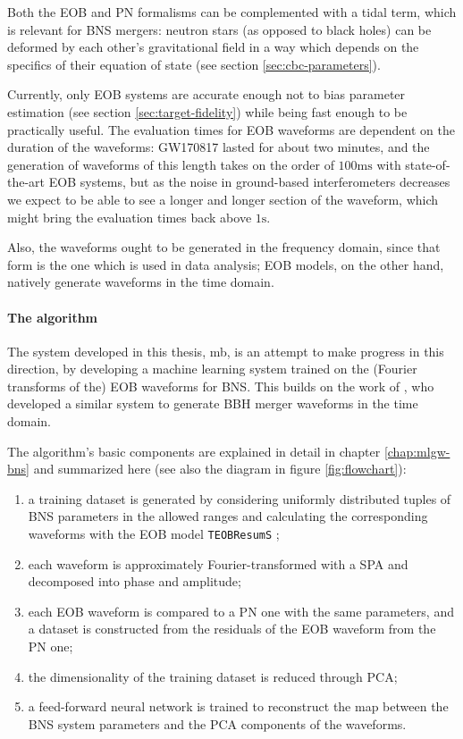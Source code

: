\documentclass[main.tex]{subfiles}
\begin{document}
Both the \ac{EOB} and \ac{PN} formalisms can be complemented with a tidal term, which is relevant for \ac{BNS} mergers: neutron stars (as opposed to black holes) can be deformed by each other's gravitational field in a way which depends on the specifics of their equation of state (see section \ref{sec:cbc-parameters}). 

Currently, only \ac{EOB} systems are accurate enough not to bias parameter estimation (see section \ref{sec:target-fidelity}) while being fast enough to be practically useful.
The evaluation times for \ac{EOB} waveforms are dependent on the duration of the waveforms: GW170817 lasted for about two minutes, and the generation of waveforms of this length takes on the order of $100\text{ms}$ with state-of-the-art \ac{EOB} systems, but as the noise in ground-based interferometers decreases we expect to be able to see a longer and longer section of the waveform, which might bring the evaluation times back above $1\text{s}$.

Also, the waveforms ought to be generated in the frequency domain, since that form is the one which is used in data analysis;
EOB models, on the other hand, natively generate waveforms in the time domain. 

\paragraph{The algorithm}

The system developed in this thesis, \ac{mb}, is an attempt to make progress in this direction, by developing a machine learning system trained on the (Fourier transforms of the) \ac{EOB} waveforms for \ac{BNS}. 
This builds on the work of \textcite{schmidtMachineLearningGravitational2020}, who developed a similar system to generate \ac{BBH} merger waveforms in the time domain.

The algorithm's basic components are explained in detail in chapter \ref{chap:mlgw-bns} and summarized here (see also the diagram in figure \ref{fig:flowchart}):
\begin{enumerate}
    \item a training dataset is generated by considering uniformly distributed tuples of \ac{BNS} parameters in the allowed ranges and calculating the corresponding waveforms with the \ac{EOB} model \texttt{TEOBResumS} \cite[]{nagarTimedomainEffectiveonebodyGravitational2018};
    \item each waveform is approximately Fourier-transformed with a \ac{SPA} \cite[]{gambaFastFaithfulFrequencydomain2020} and decomposed into phase and amplitude;
    \item each \ac{EOB} waveform is compared to a \ac{PN} one with the same parameters, and a dataset is constructed from the residuals of the \ac{EOB} waveform from the \ac{PN} one;
    \item the dimensionality of the training dataset is reduced through \ac{PCA};
    \item a feed-forward neural network is trained to reconstruct the map between the \ac{BNS} system parameters and the \ac{PCA} components of the waveforms. 
\end{enumerate}
\end{document}
